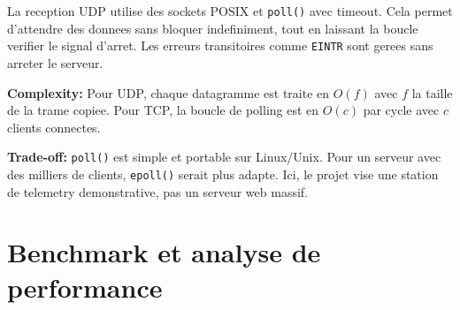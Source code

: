 \documentclass[10pt,a4paper]{article}
\newcommand{\complexity}[1]{\textbf{Complexity:} #1}
\newcommand{\tradeoff}[1]{\textbf{Trade-off:} #1}
\begin{document}
La reception UDP utilise des sockets POSIX et \texttt{poll()} avec timeout. Cela permet d'attendre des donnees sans bloquer indefiniment, tout en laissant la boucle verifier le signal d'arret. Les erreurs transitoires comme \texttt{EINTR} sont gerees sans arreter le serveur.

\complexity{Pour UDP, chaque datagramme est traite en $O(f)$ avec $f$ la taille de la trame copiee. Pour TCP, la boucle de polling est en $O(c)$ par cycle avec $c$ clients connectes.}

\tradeoff{\texttt{poll()} est simple et portable sur Linux/Unix. Pour un serveur avec des milliers de clients, \texttt{epoll()} serait plus adapte. Ici, le projet vise une station de telemetry demonstrative, pas un serveur web massif.}

\section{Benchmark et analyse de performance}
\end{document}
